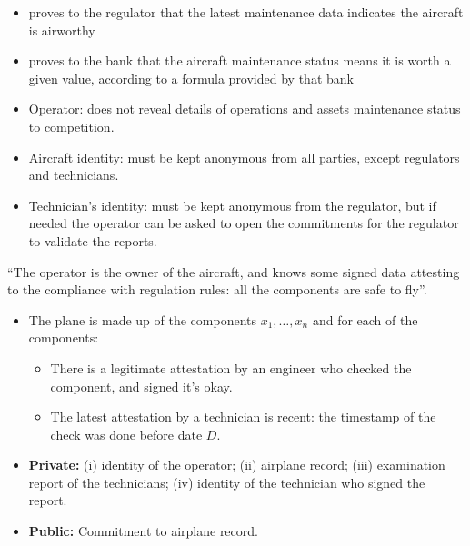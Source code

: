 \begin{itemize}
    \item proves to the regulator that the latest maintenance data indicates the aircraft is airworthy
    \item proves to the bank that the aircraft maintenance status means it is worth a given value, according to a formula provided by that bank
\end{itemize}


\begin{itemize}
    \item Operator: does not reveal details of operations and assets maintenance status to competition.\loosen
    \item Aircraft identity: must be kept anonymous from all parties, except regulators and technicians.\loosen
    \item Technician's identity: must be kept anonymous from the regulator, but if needed the operator can be asked to open the commitments for the regulator to validate the reports.
\end{itemize}

 
``The operator is the owner of the aircraft, and knows some signed data attesting to the compliance with regulation rules: all the components are safe to fly''. 
\begin{itemize}
    \item The plane is made up of the components $x_1, \ldots, x_n$ and for each of the components: 
	\begin{itemize}
        \item There is a legitimate attestation by an engineer who checked the component, and signed it's okay.
        \item The latest attestation by a technician is recent: the timestamp of the check was done before date $D$.
	\end{itemize}
\end{itemize}


\begin{itemize}
	\item \textbf{Private:}
		(i) identity of the operator;
        (ii) airplane record;
        (iii) examination report of the technicians;
        (iv) identity of the technician who signed the report.

\item \textbf{Public:} Commitment to airplane record.
\end{itemize}


